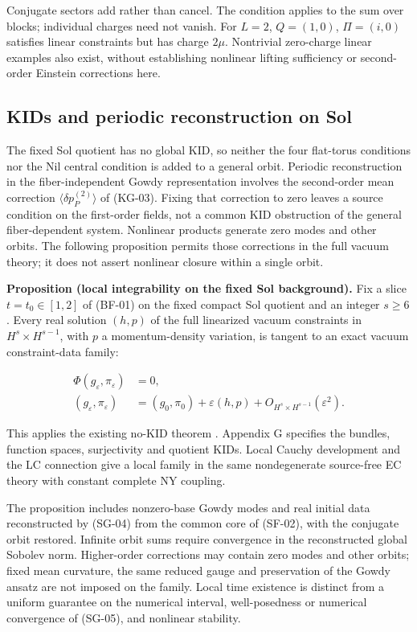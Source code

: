 Conjugate sectors add rather than cancel. The condition applies to the sum over blocks; individual charges need not vanish. For $L=2$, $Q=(1,0)$, $\Pi=(i,0)$ satisfies linear constraints but has charge $2\mu$. Nontrivial zero-charge linear examples also exist, without establishing nonlinear lifting sufficiency or second-order Einstein corrections here.

\subsection{KIDs and periodic reconstruction on Sol}

The fixed Sol quotient has no global KID, so neither the four flat-torus conditions nor the Nil central condition is added to a general orbit. Periodic reconstruction in the fiber-independent Gowdy representation involves the second-order mean correction $\langle\delta p_P^{(2)}\rangle$ of (KG-03). Fixing that correction to zero leaves a source condition on the first-order fields, not a common KID obstruction of the general fiber-dependent system. Nonlinear products generate zero modes and other orbits. The following proposition permits those corrections in the full vacuum theory; it does not assert nonlinear closure within a single orbit.

\textbf{Proposition (local integrability on the fixed Sol background).}
Fix a slice $t=t_0\in[1,2]$ of (BF-01) on the fixed compact Sol quotient and an integer $s\ge6$. Every real solution $(h,p)$ of the full linearized vacuum constraints in $H^s\times H^{s-1}$, with $p$ a momentum-density variation, is tangent to an exact vacuum constraint-data family:

\begin{equation}\tag{SL-01}\label{eq:SL-01}
\begin{aligned}
\Phi(g_\varepsilon,\pi_\varepsilon)&=0,\\
(g_\varepsilon,\pi_\varepsilon)&=(g_0,\pi_0)+\varepsilon(h,p)
+O_{H^s\times H^{s-1}}(\varepsilon^2).
\end{aligned}
\end{equation}

This applies the existing no-KID theorem \cite{FischerMarsdenMoncrief1980}. Appendix G specifies the bundles, function spaces, surjectivity and quotient KIDs. Local Cauchy development and the LC connection give a local family in the same nondegenerate source-free EC theory with constant complete NY coupling.

The proposition includes nonzero-base Gowdy modes and real initial data reconstructed by (SG-04) from the common core of (SF-02), with the conjugate orbit restored. Infinite orbit sums require convergence in the reconstructed global Sobolev norm. Higher-order corrections may contain zero modes and other orbits; fixed mean curvature, the same reduced gauge and preservation of the Gowdy ansatz are not imposed on the family. Local time existence is distinct from a uniform guarantee on the numerical interval, well-posedness or numerical convergence of (SG-05), and nonlinear stability.

